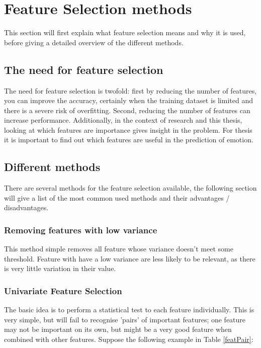 \chapter{Feature Selection methods}
{\samenvatting This section will first explain what feature selection means and why it is used, before giving a detailed overview of the different methods.}


\section{The need for feature selection}
The need for feature selection is twofold: first by reducing the number of features, you can improve the accuracy, certainly when the training dataset is limited and there is a severe risk of overfitting. Second, reducing the number of features can increase performance. Additionally, in the context of research and this thesis, looking at which features are importance gives insight in the problem. For thesis it is important to find out which features are useful in the prediction of emotion.

\section{Different methods}
There are several methods for the feature selection available, the following section will give a list of the most common used methods and their advantages / disadvantages.

\subsection{Removing features with low variance}
This method simple removes all feature whose variance doesn't meet some threshold. Feature with have a low variance are less likely to be relevant, as there is very little variation in their value.

\subsection{Univariate Feature Selection}
The basic idea is to perform a statistical test to each feature individually. This is very simple, but will fail to recognise 'pairs' of important features; one feature may not be important on its own, but might be a very good feature when combined with other features. Suppose the following example in Table \ref{featPair}:

